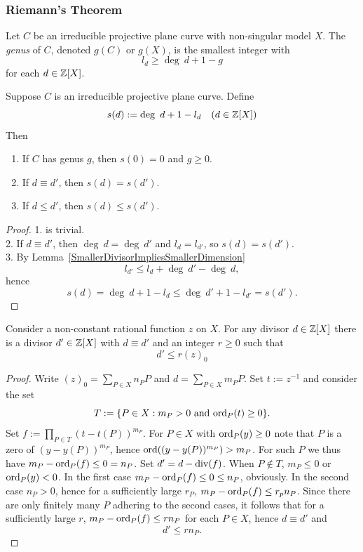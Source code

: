     \subsubsection{Riemann's Theorem}
    \begin{definition}
        Let $C$ be an irreducible projective plane curve with non-singular model $X$. The \emph{genus} of $C$, denoted $g(C)$ or $g(X)$, is the smallest integer with 
        $$
            l_d \geq \deg \ d + 1 -g
        $$
        for each $d\in \mathbb{Z}[X]$. 
    \end{definition}
    \begin{lemma}
        Suppose $C$ is an irreducible projective plane curve. Define 
        $$
            s(d) := \deg \ d +1 -l_d\quad (d\in \mathbb{Z}[X])
        $$
        Then 
        \begin{enumerate}
            \item If $C$ has genus $g$, then $s(0)=0$ and $g\geq 0$.
            \item If $d\equiv d'$, then $s(d)=s(d')$.
            \item If $d\leq d'$, then $s(d)\leq s(d')$.
        \end{enumerate}
    \end{lemma}
    \begin{proof}
        1. is trivial.\\
        2. If $d\equiv d'$, then $\deg \ d = \deg \ d'$ and $l_d = l_{d'}$, so $s(d)=s(d')$.\\
        3. By Lemma~\ref{SmallerDivisorImpliesSmallerDimension}
        $$
            l_{d'} \leq l_d + \deg \ d' -\deg \ d, 
        $$
        hence
        $$
            s(d) = \deg \ d + 1 - l_d  \leq \deg \ d' +1 - l_{d'} = s(d').
        $$
    \end{proof}
    \begin{lemma}\label{ExistenceOfGenusObservingDivisor}
        Consider a non-constant rational function $z$ on $X$. For any divisor $d\in \mathbb{Z}[X]$ there is a divisor $d'\in \mathbb{Z}[X]$ with $d\equiv d'$ and an integer $r\geq 0$ such that 
        $$
            d'\leq r(z)_0
        $$
    \end{lemma}
    \begin{proof}
        Write $(z)_0 = \sum_{P\in X} n_PP$ and $d=\sum_{P\in X} m_P P$. Set $t:= z^{-1}$ and consider the set 
        $$
            T:= \{P\in X : m_P>0 \text{ and } \mathrm{ord}_P(t)\geq 0\}.
        $$
        Set $f := \prod_{P\in T} (t-t(P))^{m_P}$. For $P\in X $ with $\mathrm{ord}_P(y)\geq 0$ note that $P$ is a zero of $(y-y(P))^{m_P}$, hence $\mathrm{ord}((y-y(P))^{m_P})>m_P$. For such $P$ we thus have $m_P-\mathrm{ord}_P(f) \leq 0 = n_P$. Set $d' = d-\mathrm{div}(f)$. When $P\notin T$, $m_P\leq 0$ or $\mathrm{ord}_P(y) <0$. In the first case $m_P-\mathrm{ord}_P(f)\leq 0\leq n_P$, obviously. In the second case $n_P>0$, hence for a sufficiently large $r_P$, $m_P-\mathrm{ord}_P(f)\leq r_pn_P$. Since there are only finitely many $P$ adhering to the second cases, it follows that for a sufficiently large $r$, $m_P-\mathrm{ord}_P(f)\leq rn_P$ for each $P\in X$, hence $d\equiv d'$ and  
        $$
            d' \leq rn_P.
        $$
    \end{proof}
